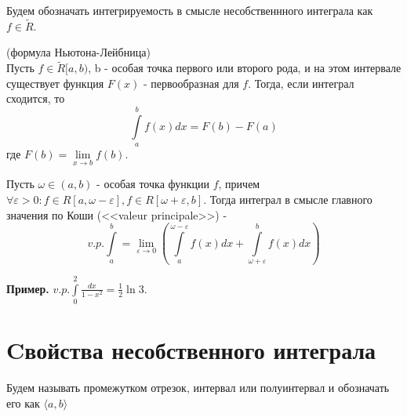 Будем обозначать интегрируемость в смысле несобственнного интеграла как
$f\in \tilde R$.
\begin{theor}
    (формула Ньютона-Лейбница)\\
    Пусть $f\in \tilde R[a,b)$, b - особая точка первого или второго рода, 
    и на этом интервале существует функция $F(x)$ - первообразная для  $f$. 
    Тогда, если интеграл сходится, то
     $$\int\limits_{a}^{b}f(x)dx=F(b)-F(a)$$ 
     где $F(b)=\lim\limits_{x \to b}f(b)$.
\end{theor}
\begin{defin}
Пусть $\omega \in (a,b)$ - особая точка функции $f$, причем
$\forall \varepsilon>0:f\in R[a,\omega-\varepsilon],f\in R[\omega+\varepsilon,
b]$. Тогда интеграл в смысле главного значения по Коши 
(<<valeur principale>>) - 
$$v.p. \int\limits_{a}^{b}=\lim\limits_{\varepsilon \to 0}\left(
\int\limits_{a}^{\omega-\varepsilon}f(x)dx+\int\limits_{\omega+\varepsilon}^{b}
f(x)dx\right)$$
\end{defin}
\textbf{Пример.} $v.p. \int\limits_{0}^{2}\frac{dx}{1-x^2}=\frac{1}{2}\ln3$.

\section{Cвойства несобственного интеграла}
Будем называть промежутком отрезок, интервал или полуинтервал и обозначать
его как $\langle a, b\rangle$

